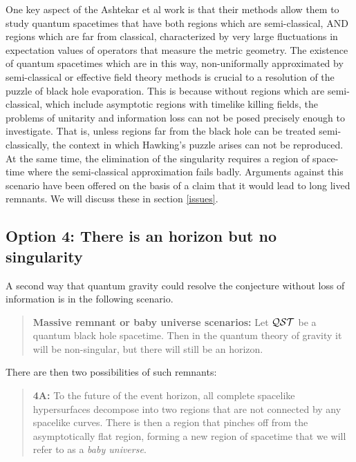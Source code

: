 \documentclass[12pt]{article}
\begin{document}
One key aspect of the Ashtekar et al work is that their methods allow them to study quantum spacetimes that have both regions which 
are semi-classical, AND regions which are far from classical,  characterized by very large fluctuations in expectation values of operators that measure the metric geometry.  The existence of quantum spacetimes which are in this way, non-uniformally approximated by semi-classical or effective field theory methods is
crucial to a resolution of the puzzle of black hole evaporation.  This is because without regions which are semi-classical, which include
asymptotic regions with timelike killing fields, the problems of unitarity and information loss can not be posed precisely enough to 
investigate.  That is, unless regions far from the black hole can be treated semi-classically, the context in which Hawking's puzzle arises can not be reproduced.  At the same time, the elimination of the singularity requires a region of space-time where the semi-classical
approximation fails badly. 
Arguments against this scenario have been offered on the basis of a claim that it would lead to long lived remnants. 
We will discuss these in section \ref{issues}. 

\subsection*{Option 4: There is an horizon but no singularity}

A second way that quantum gravity could resolve the conjecture without loss of information is in the following scenario. 

\begin{quotation}

{\bf Massive remnant or baby universe scenarios:} Let  ${\cal Q}{\cal S}{\cal T}$ be a quantum  black hole spacetime.  Then in the quantum theory of gravity it will be non-singular, but there will still be an horizon.  

\end{quotation}

There are then two possibilities of such remnants:  

\begin{quotation}

{\bf 4A:} To the future of the event horizon, all complete spacelike hypersurfaces decompose into two regions that are not connected by any spacelike curves. There is then a region that pinches off from the asymptotically flat region, forming a new region of spacetime that we
will refer to as a {\it baby universe}. 

\end{quotation}
\end{document}
